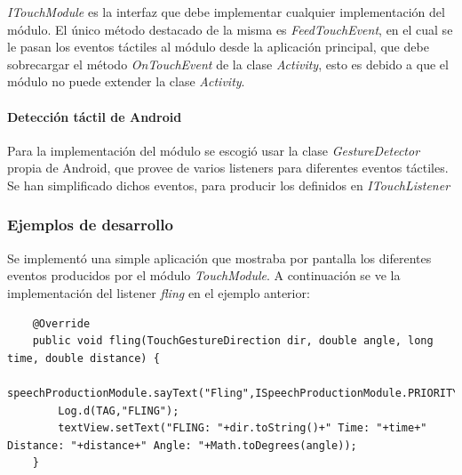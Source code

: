 \textit{ITouchModule} es la interfaz que debe implementar cualquier implementación del módulo. El único método destacado de la misma es \textit{FeedTouchEvent}, en el cual se le pasan los eventos táctiles al módulo desde la aplicación principal, que debe sobrecargar el método \textit{OnTouchEvent} de la clase \textit{Activity}, esto es debido a que el módulo no puede extender la clase \textit{Activity}.

\paragraph*{Detección táctil de Android\\}


Para la implementación del módulo se escogió usar la clase \textit{GestureDetector} propia de Android, que provee de varios listeners para diferentes eventos táctiles.
Se han simplificado dichos eventos, para producir los definidos en \textit{ITouchListener}

\subsubsection*{Ejemplos de desarrollo}

Se implementó una simple aplicación que mostraba por pantalla los diferentes eventos producidos por el módulo \textit{TouchModule}.
 A continuación se ve la implementación del listener \textit{fling} en el ejemplo anterior:
 
 \begin{lstlisting}
 	@Override
    public void fling(TouchGestureDirection dir, double angle, long time, double distance) {
        speechProductionModule.sayText("Fling",ISpeechProductionModule.PRIORITY_HIGH);
        Log.d(TAG,"FLING");
        textView.setText("FLING: "+dir.toString()+" Time: "+time+" Distance: "+distance+" Angle: "+Math.toDegrees(angle));
    }
 \end{lstlisting}


\newpage

